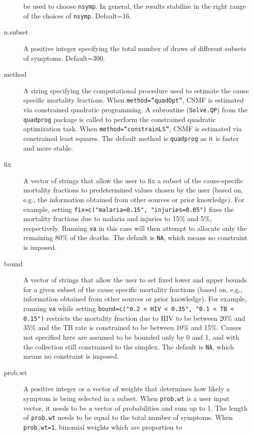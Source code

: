 \documentclass[oneside,letterpaper,titlepage]{article}
\begin{document}
\begin{description}
  be used to choose \texttt{nsymp}. In general, the results stabilize in 
  the right range of the choices of \texttt{nsymp}. Default=16.
\item[n.subset] A positive integer specifying the total number of
  draws of different subsets of symptoms.  Default=300.
\item[method] A string specifying the computational procedure
 used to estimate the cause specific mortality fractions. When 
\texttt{method=''quadOpt''}, CSMF is estimated via constrained 
quadratic programming. A subroutine (\texttt{Solve.QP}) from the 
\texttt{quadprog} package is called to perform the constrained 
quadratic optimization task. When \texttt{method=``constrainLS''},
CSMF is estimated via constrained least squares. The default method
is \texttt{quadprog} as it is faster and more stable. 
\item[fix] A vector of strings that allow the user to fix a subset of
  the cause-specific mortality fractions to predetermined values
  chosen by the user (based on, e.g., the information obtained from
  other sources or prior knowledge).  For example, setting
  \texttt{fix=c("malaria=0.15", "injuries=0.05")} fixes the mortality
  fractions due to malaria and injuries to 15\% and 5\%, respectively.
  Running \texttt{va} in this case will then attempt to allocate only the
  remaining 80\% of the deaths.  The default is \texttt{NA}, which
  means no constraint is imposed.
\item[bound] A vector of strings that allow the user to set fixed
  lower and upper bounds for a given subset of the cause specific
  mortality fractions (based on, e.g., information obtained from other
  sources or prior knowledge).  For example, running \texttt{va} while setting
  \texttt{bound=c("0.2 < HIV < 0.35", "0.1 < TB < 0.15")} restricts
  the mortality fraction due to HIV to be between 20\% and 35\% and the
  TB rate is constrained to be between 10\% and 15\%.  Causes not
  specified here are assumed to be bounded only by 0 and 1, and with
  the collection still constrained to the simplex.  The default is
  \texttt{NA}, which means no constraint is imposed.
\item[prob.wt] A positive integer or a vector of weights that 
  determines how likely a symptom is being selected in a subset. 
  When \texttt{prob.wt} is a user input vector, it needs to be a vector 
  of probabilities and sum up to 1. The length of \texttt{prob.wt} 
  needs to be equal to the total number of symptoms. 
  When \texttt{prob.wt=1}, binomial weights which are proportion to 

\end{description}
\end{document}
